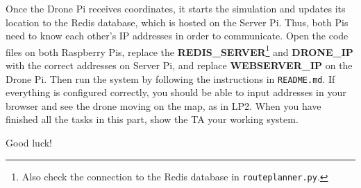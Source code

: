 \documentclass{article}
\begin{document}
Once the Drone Pi receives coordinates, it starts the simulation and updates its location to the Redis database, which is hosted on the Server Pi. Thus, both Pis need to know each other's IP addresses in order to communicate. Open the code files on both Raspberry Pis, replace the {\bf REDIS\_SERVER}\footnote{Also check the connection to the Redis database in \texttt{routeplanner.py}.} and {\bf DRONE\_IP} with the correct addresses on Server Pi, and replace {\bf WEBSERVER\_IP} on the Drone Pi. Then run the system by following the instructions in \verb!README.md!. If everything is configured correctly, you should be able to input addresses in your browser and see the drone moving on the map, as in LP2. When you have finished all the tasks in this part, show the TA your working system.
\vspace{1cm}
\begin{center}
\huge Good luck!
\end{center}

% 




\end{document}
